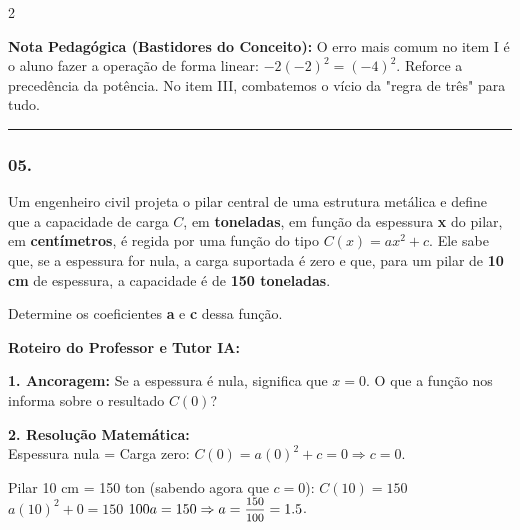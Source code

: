 \begin{multicols*}{2}
    \begin{boxexplicacao}
    \textbf{Nota Pedagógica (Bastidores do Conceito):} O erro mais comum no item I é o aluno fazer a operação de forma linear: $-2(-2)^2 = (-4)^2$. Reforce a precedência da potência. No item III, combatemos o vício da "regra de três" para tudo.
    \end{boxexplicacao}
\fi

\par\vspace{\espacoQuestao}

\noindent\textcolor{CorLinha}{\rule{\linewidth}{0.5pt}} 
\par\vspace{\espacoPreQuestao}
\subsubsection*{05.} 
\begin{enunciadoLiteral}
Um engenheiro civil projeta o pilar central de uma estrutura metálica e define que a capacidade de carga $C$, em \textbf{toneladas}, em função da espessura \textbf{x} do pilar, em \textbf{centímetros}, é regida por uma função do tipo $C(x) = ax^2 + c$. Ele sabe que, se a espessura for nula, a carga suportada é zero e que, para um pilar de \textbf{10 cm} de espessura, a capacidade é de \textbf{150 toneladas}.

Determine os coeficientes \textbf{a} e \textbf{c} dessa função.
\end{enunciadoLiteral}

\ifgabarito
    \begin{tcolorbox}[colback=CorTitUm!5, colframe=CorTitUm, boxrule=1pt, arc=4pt, left=6pt, right=6pt, top=6pt, bottom=6pt]
    \small\textbf{\textcolor{CorTitUm}{Roteiro do Professor e Tutor IA:}}\par\vspace{0.1cm}
    \color{CinzaEscuro}
    \textbf{1. Ancoragem:} Se a espessura é nula, significa que $x=0$. O que a função nos informa sobre o resultado $C(0)$?\par\vspace{0.1cm}
    \textbf{2. Resolução Matemática:}\\
    Espessura nula = Carga zero: 
    $C(0) = a(0)^2 + c = 0 \Rightarrow c = 0$.
    
    Pilar 10 cm = 150 ton (sabendo agora que $c=0$): 
    $C(10) = 150$
    $a(10)^2 + 0 = 150$
    $100a = 150 \Rightarrow a = \mfrac{150}{100} = 1.5$.
    

\end{tcolorbox}
\end{multicols*}
